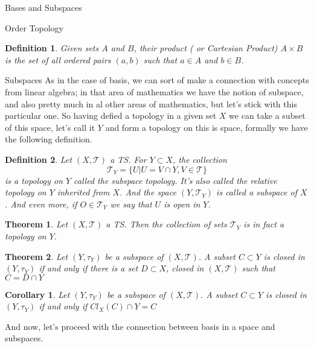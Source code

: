 \documentclass[12pt]{article}
\newtheorem{definition}{Definition}
\newtheorem{theorem}{Theorem}
\newtheorem{corollary}{Corollary}[theorem]
\begin{document}
\begin{section}{Bases and Subspaces}
\begin{subsection}{Order Topology}
\begin{definition}
Given sets $A$ and $B$, their product ( or Cartesian Product) $A\times B$ is the set of all ordered pairs $(a,b)$ such that $a\in A$ and $b\in B$.
\end{definition}

\end{subsection}

\begin{subsection}{Subspaces}
As in the case of basis, we can sort of make a connection with concepts from linear algebra; in that area of mathematics we have the notion of subspace, and also pretty much in al other areas of mathematics, but let's stick with this particular one. So having defied a topology in a given set $X$ we can take a subset of this space, let's call it $Y$ and form a topology on this is space, formally we have the following definition.

\begin{definition}
Let $\left(X, \mathcal{T}\right)$ a TS. For $Y\subset X$, the collection 
$$
	\mathcal{T}_{Y}=\{ U| U = V \cap Y, V\in \mathcal{T}\}
$$
is a topology on $Y$ called the subspace topology. It's also called the relative topology on $Y$ inherited from $X$. And the space $\left( Y,\mathcal{T}_{Y}\right)$ is called a subspace of $X$. And even more, if $O\in\mathcal{T}_{Y}$ we say that $U$ is open in $Y$.
\end{definition}

\begin{theorem}
Let $\left(X, \mathcal{T}\right)$ a TS. Then the collection of sets $\mathcal{T}_{Y}$ is in fact a topology on $Y$.
\end{theorem}

\begin{theorem}
Let $\left(Y, \tau_{Y} \right)$ be a subspace of $\left(X, \mathcal{T}\right)$. A subset $C\subset Y$ is closed in $\left(Y, \tau_{Y} \right)$ if and only if there is a set $D\subset X$, closed in $\left(X, \mathcal{T}\right)$ such that $C=D\cap Y$
\end{theorem}

\begin{corollary}
Let $\left(Y, \tau_{Y} \right)$ be a subspace of $\left(X, \mathcal{T}\right)$. A subset $C\subset Y$ is closed in $\left(Y, \tau_{Y} \right)$ if and only if $Cl_{X}(C)\cap Y = C$
\end{corollary}

And now, let's proceed with the connection between basis in a space and subspaces.


\end{subsection}
\end{section}
\end{document}
